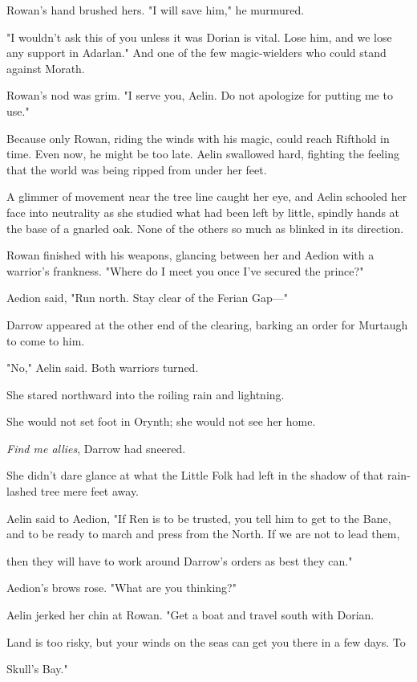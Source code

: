 Rowan's hand brushed hers. "I will save him," he murmured.

"I wouldn't ask this of you unless it was  Dorian is vital. Lose him, and we lose any support in Adarlan." And one of the few magic-wielders who could stand against Morath.

Rowan's nod was grim. "I serve you, Aelin. Do not apologize for putting me to use."

Because only Rowan, riding the winds with his magic, could reach Rifthold in time. Even now, he might be too late. Aelin swallowed hard, fighting the feeling that the world was being ripped from under her feet.

A glimmer of movement near the tree line caught her eye, and Aelin schooled her face into neutrality as she studied what had been left by little, spindly hands at the base of a gnarled oak. None of the others so much as blinked in its direction.

Rowan finished with his weapons, glancing between her and Aedion with a warrior's frankness. "Where do I meet you once I've secured the prince?"

Aedion said, "Run north. Stay clear of the Ferian Gap---"

Darrow appeared at the other end of the clearing, barking an order for Murtaugh to come to him.

"No," Aelin said. Both warriors turned.

She stared northward into the roiling rain and lightning.

She would not set foot in Orynth; she would not see her home.

\emph{Find me allies}, Darrow had sneered.

She didn't dare glance at what the Little Folk had left in the shadow of that rain-lashed tree mere feet away.

Aelin said to Aedion, "If Ren is to be trusted, you tell him to get to the Bane, and to be ready to march and press from the North. If we are not to lead them,

then they will have to work around Darrow's orders as best they can."

Aedion's brows rose. "What are you thinking?"

Aelin jerked her chin at Rowan. "Get a boat and travel south with Dorian.

Land is too risky, but your winds on the seas can get you there in a few days. To

Skull's Bay."


